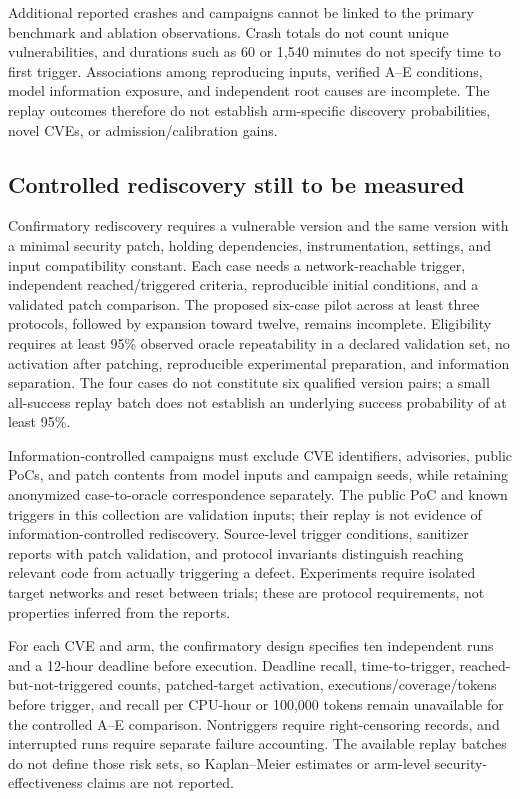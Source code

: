 \documentclass[final,5p,times,number]{elsarticle}
\begin{document}
Additional reported crashes and campaigns cannot be linked to the primary benchmark and ablation observations. Crash totals do not count unique vulnerabilities, and durations such as 60 or 1,540 minutes do not specify time to first trigger. Associations among reproducing inputs, verified A--E conditions, model information exposure, and independent root causes are incomplete. The replay outcomes therefore do not establish arm-specific discovery probabilities, novel CVEs, or admission/calibration gains.

\subsection{Controlled rediscovery still to be measured}
Confirmatory rediscovery requires a vulnerable version and the same version with a minimal security patch, holding dependencies, instrumentation, settings, and input compatibility constant. Each case needs a network-reachable trigger, independent reached/triggered criteria, reproducible initial conditions, and a validated patch comparison. The proposed six-case pilot across at least three protocols, followed by expansion toward twelve, remains incomplete. Eligibility requires at least 95\% observed oracle repeatability in a declared validation set, no activation after patching, reproducible experimental preparation, and information separation. The four cases do not constitute six qualified version pairs; a small all-success replay batch does not establish an underlying success probability of at least 95\%.

Information-controlled campaigns must exclude CVE identifiers, advisories, public PoCs, and patch contents from model inputs and campaign seeds, while retaining anonymized case-to-oracle correspondence separately. The public PoC and known triggers in this collection are validation inputs; their replay is not evidence of information-controlled rediscovery. Source-level trigger conditions, sanitizer reports with patch validation, and protocol invariants distinguish reaching relevant code from actually triggering a defect. Experiments require isolated target networks and reset between trials; these are protocol requirements, not properties inferred from the reports.

For each CVE and arm, the confirmatory design specifies ten independent runs and a 12-hour deadline before execution. Deadline recall, time-to-trigger, reached-but-not-triggered counts, patched-target activation, executions/coverage/tokens before trigger, and recall per CPU-hour or 100,000 tokens remain unavailable for the controlled A--E comparison. Nontriggers require right-censoring records, and interrupted runs require separate failure accounting. The available replay batches do not define those risk sets, so Kaplan--Meier estimates or arm-level security-effectiveness claims are not reported.
\end{document}

